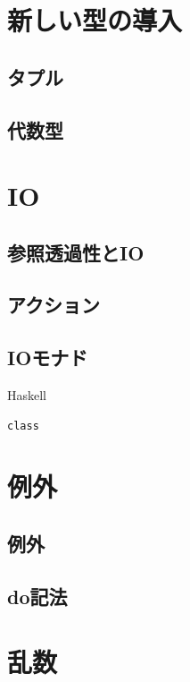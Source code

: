 \documentclass[a4paper]{jsbook}
\newcommand{\programminglanguage}[1]{\textsf{#1}}
\newcommand{\haskell}{\programminglanguage{Haskell}}
\newenvironment{haskellcode}{\begin{itembox}[r]{\haskell}}{\end{itembox}}
\begin{document}
\chapter{新しい型の導入}

\section{タプル}

\section{代数型}




\chapter{IO}

\section{参照透過性とIO}

\section{アクション}

\section{IOモナド}

\begin{haskellcode}
\begin{verbatim}
class
\end{verbatim}
\end{haskellcode}


\chapter{例外}

\section{例外}

\section{do記法}

\chapter{乱数}
\end{document}
